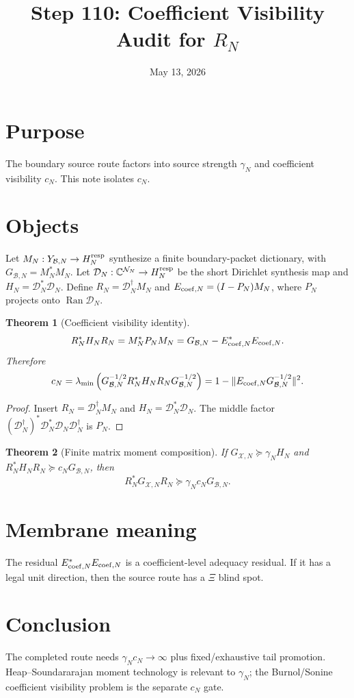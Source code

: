 \documentclass[11pt]{article}
\title{Step 110: Coefficient Visibility Audit for $R_N$}
\date{May 13, 2026}
\newtheorem{theorem}{Theorem}
\begin{document}
\maketitle
\section{Purpose}
The boundary source route factors into source strength $\gamma_N$ and coefficient visibility $c_N$. This note isolates $c_N$.
\section{Objects}
Let $M_N:Y_{\mathcal B,N}\to H_N^{\rm resp}$ synthesize a finite boundary-packet dictionary, with $G_{\mathcal B,N}=M_N^*M_N$. Let $\mathcal D_N:\mathbb C^{\mathcal N_N}\to H_N^{\rm resp}$ be the short Dirichlet synthesis map and $H_N=\mathcal D_N^*\mathcal D_N$. Define $R_N=\mathcal D_N^\dagger M_N$ and $E_{{\rm coef},N}=(I-P_N)M_N$, where $P_N$ projects onto $\operatorname{Ran}\mathcal D_N$.
\begin{theorem}[Coefficient visibility identity]
\[
R_N^*H_NR_N=M_N^*P_NM_N=G_{\mathcal B,N}-E_{{\rm coef},N}^*E_{{\rm coef},N}.
\]
Therefore
\[
c_N=\lambda_{\min}\left(G_{\mathcal B,N}^{-1/2}R_N^*H_NR_NG_{\mathcal B,N}^{-1/2}\right)=1-\|E_{{\rm coef},N}G_{\mathcal B,N}^{-1/2}\|^2.
\]
\end{theorem}
\begin{proof}
Insert $R_N=\mathcal D_N^\dagger M_N$ and $H_N=\mathcal D_N^*\mathcal D_N$. The middle factor $(\mathcal D_N^\dagger)^*\mathcal D_N^*\mathcal D_N\mathcal D_N^\dagger$ is $P_N$.
\end{proof}
\begin{theorem}[Finite matrix moment composition]
If $G_{\mathcal X,N}\succeq\gamma_NH_N$ and $R_N^*H_NR_N\succeq c_NG_{\mathcal B,N}$, then
\[
R_N^*G_{\mathcal X,N}R_N\succeq\gamma_Nc_NG_{\mathcal B,N}.
\]
\end{theorem}
\section{Membrane meaning}
The residual $E_{{\rm coef},N}^*E_{{\rm coef},N}$ is a coefficient-level adequacy residual. If it has a legal unit direction, then the source route has a $\Xi$ blind spot.
\section{Conclusion}
The completed route needs $\gamma_Nc_N\to\infty$ plus fixed/exhaustive tail promotion. Heap--Soundararajan moment technology is relevant to $\gamma_N$; the Burnol/Sonine coefficient visibility problem is the separate $c_N$ gate.
\end{document}
